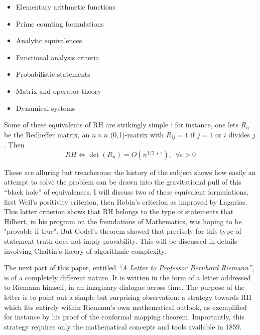 \documentclass{article}
\begin{document}
\begin{itemize}
\item Elementary arithmetic functions
\item Prime counting formulations  
\item Analytic equivalences
\item Functional analysis criteria
\item Probabilistic statements
\item Matrix and operator theory
\item Dynamical systems
\end{itemize}
 Some of these equivalents of RH are strikingly simple : for instance, one lets 
  $R_n$ be the Redheffer matrix,  an $n \times n$ (0,1)-matrix with $R_{ij} = 1$ if $j = 1$ or $i$ divides $j$. Then 
  $$ RH \iff \det(R_n) = O(n^{1/2+\epsilon}), \ \ \forall \epsilon > 0$$
  
 These are alluring but treacherous: the history of the subject shows how easily an attempt to solve the problem can be drawn into the gravitational pull of this ``black hole'' of equivalences.\newline
 I will discuss two of these equivalent formulations, first Weil's positivity criterion, then Robin's criterion as improved by Lagarias. This latter criterion shows that RH belongs to the type of statements that Hilbert, in his program on the foundations of Mathematics, was hoping to be "provable if true". But Godel's theorem showed that precisely for this type of statement truth does not imply provability. This will be discussed in details involving Chaitin's theory of algorithmic complexity.
 
 
 The next part of this paper, entitled \textit{``A Letter to Professor Bernhard Riemann''}, 
is of a completely different nature. It is written in the form of a letter addressed 
to Riemann himself, in an imaginary dialogue across time. The purpose of the letter 
is to point out a simple but surprising observation: a strategy towards RH which 
fits entirely within Riemann’s own mathematical outlook, as exemplified for instance 
by his proof of the conformal mapping theorem. Importantly, this strategy requires 
only the mathematical concepts and tools available in 1859.
\end{document}
